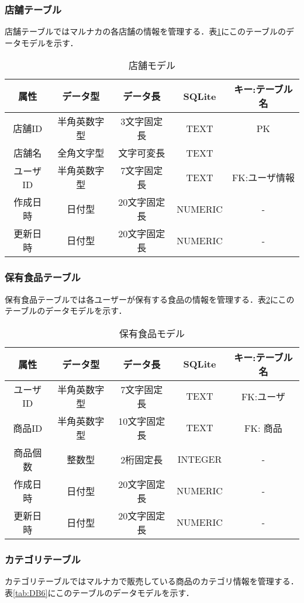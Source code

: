 \documentclass[a4j]{jarticle}
\begin{document}
\subsubsection{店舗テーブル}
店舗テーブルではマルナカの各店舗の情報を管理する．表\ref{tab:DB4}にこのテーブルのデータモデルを示す．
\begin{table}[H]
\caption{店舗モデル}
\label{tab:DB4}
\begin{center}
\begin{tabular}{|c|c|c|c|c|}
\hline
属性　&データ型&データ長&SQLite&キー:テーブル名\\ \hline\hline
店舗ID &半角英数字型&3文字固定長&TEXT&PK \\ \hline
店舗名 &全角文字型&文字可変長&TEXT& \\ \hline
ユーザID &半角英数字型&7文字固定長&TEXT&FK:ユーザ情報  \\ \hline
作成日時  &日付型&20文字固定長&NUMERIC&- \\ \hline
更新日時 &日付型&20文字固定長&NUMERIC&-  \\ \hline
\end{tabular}
\end{center}
\end{table}
\subsubsection{保有食品テーブル}
保有食品テーブルでは各ユーザーが保有する食品の情報を管理する．表\ref{tab:DB5}にこのテーブルのデータモデルを示す．
\begin{table}[H]
\caption{保有食品モデル}
\label{tab:DB5}
\begin{center}
\begin{tabular}{|c|c|c|c|c|}
\hline
属性　&データ型&データ長&SQLite&キー:テーブル名\\ \hline\hline
ユーザID &半角英数字型&7文字固定長&TEXT&FK:ユーザ  \\ \hline
商品ID &半角英数字型&10文字固定長&TEXT&FK: 商品\\ \hline
商品個数 &整数型&2桁固定長&INTEGER&- \\ \hline
 作成日時  &日付型&20文字固定長&NUMERIC&- \\ \hline
更新日時 &日付型&20文字固定長&NUMERIC&-  \\ \hline
\end{tabular}
\end{center}
\end{table}

\subsubsection{カテゴリテーブル}
カテゴリテーブルではマルナカで販売している商品のカテゴリ情報を管理する．表\ref{tab:DB6}にこのテーブルのデータモデルを示す．
\end{document}
